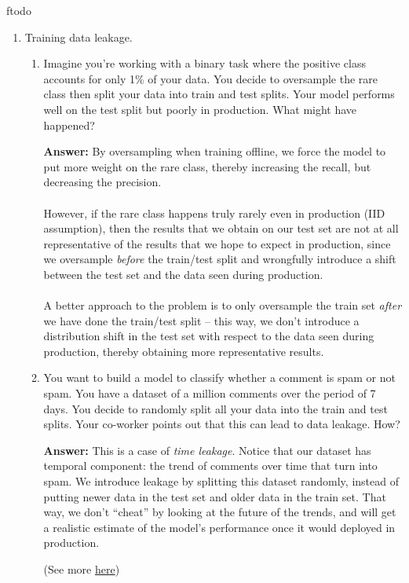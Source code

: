 ƒtodo\documentclass{article}
\newenvironment{QandA}{\begin{enumerate}[label=\arabic*.]}{\end{enumerate}}
\newenvironment{InnerQandA}{\begin{enumerate}[label=\roman*.]}{\end{enumerate}}
\newenvironment{answer}{\par\normalfont \textbf{Answer:}}{}
\begin{document}
\begin{QandA}
    \item Training data leakage.
    \begin{InnerQandA}
        \item Imagine you're working with a binary task where the positive class accounts for only 1\% of your data. You decide to oversample the rare class then split your data into train and test splits. Your model performs well on the test split but poorly in production. What might have happened?
        \begin{answer}
            By oversampling when training offline, we force the model to put more weight on the rare class, thereby increasing the recall, but decreasing the precision. \\\\
            However, if the rare class happens truly rarely even in production (IID assumption), then the results that we obtain on our test set are not at all representative of the results that we hope to expect in production, since we oversample \textit{before} the train/test split and wrongfully introduce a shift between the test set and the data seen during production. \\\\
            A better approach to the problem is to only oversample the train set \textit{after} we have done the train/test split -- this way, we don't introduce a distribution shift in the test set with respect to the data seen during production, thereby obtaining more representative results.
        \end{answer}

        \item You want to build a model to classify whether a comment is spam or not spam. You have a dataset of a million comments over the period of 7 days. You decide to randomly split all your data into the train and test splits. Your co-worker points out that this can lead to data leakage. How?
        \begin{answer}
            This is a case of \textit{time leakage}. Notice that our dataset has temporal component: the trend of comments over time that turn into spam. We introduce leakage by splitting this dataset randomly, instead of putting newer data in the test set and older data in the train set. That way, we don't ``cheat'' by looking at the future of the trends, and will get a realistic estimate of the model's performance once it would deployed in production.

            (See more \href{https://en.wikipedia.org/wiki/Leakage_(machine_learning)}{here})
        \end{answer}
    \end{InnerQandA}


\end{QandA}
\end{document}
